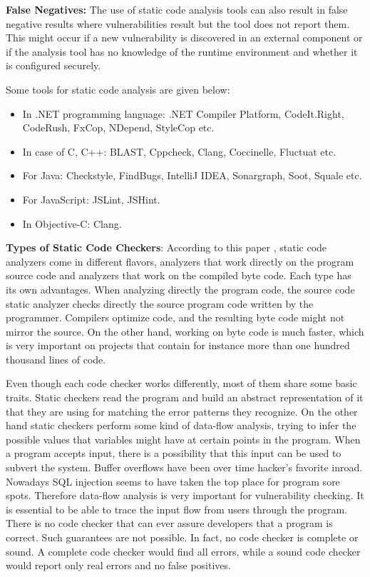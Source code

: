 \textbf{False Negatives:}
The use of static code analysis tools can also result in false negative results where vulnerabilities result but the tool does not report them. This might occur if a new vulnerability is discovered in an external component or if the analysis tool has no knowledge of the runtime environment and whether it is configured securely.

Some tools for static code analysis are given below:
\begin{itemize}
	\item In .NET programming language: .NET Compiler Platform, CodeIt.Right, CodeRush, FxCop, NDepend, StyleCop etc.
	\item In case of C, C++: BLAST, Cppcheck, Clang, Coccinelle, Fluctuat etc.  
	\item For Java: Checkstyle, FindBugs, IntelliJ IDEA, Sonargraph, Soot, Squale etc.
	\item For JavaScript: JSLint, JSHint. 
	\item In Objective-C: Clang.
\end{itemize}

\textbf{Types of Static Code Checkers}: According to this paper \cite{ref_91_bardas2010static}, static code analyzers come in different flavors, analyzers that work directly on the
program source code and analyzers that work on the compiled byte code. Each type has its own advantages. When analyzing directly the program code, the source code static analyzer checks directly the source program code written by the programmer. Compilers optimize code, and the resulting byte code might not mirror the source. On the other hand, working on byte code is much faster, which is very important on
projects that contain for instance more than one hundred thousand lines of code.

Even though each code checker works differently, most of them share some basic traits. Static checkers read the program and build an abstract representation of it that they are using for matching the error patterns they recognize. On the other hand static checkers
perform some kind of data-flow analysis, trying to infer the possible values that variables might have at certain points in the program. When a program accepts input, there is a possibility that this input can be used to subvert the system. Buffer overflows have been over time hacker's favorite inroad. Nowadays SQL injection seems to have taken the top
place for program sore spots. Therefore data-flow analysis is very important for vulnerability checking. It is essential to be able to trace the input flow from users through the program. There is no code checker that can ever assure developers that a program is correct. Such guarantees are not possible. In fact, no code checker is complete or sound. A complete code checker would find all errors, while a sound code checker would report only real errors and no false positives.

